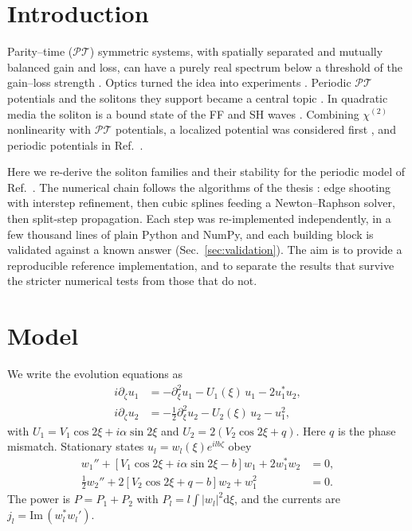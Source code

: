 \documentclass[pra,twocolumn,superscriptaddress,longbibliography]{revtex4-2}
\newcommand{\PT}{\mathcal{PT}}
\newcommand{\chit}{\chi^{(2)}}
\newcommand{\Img}{\mathrm{Im}\,}
\newcommand{\dd}{\mathrm{d}}
\begin{document}
\section{Introduction}
Parity--time ($\PT$) symmetric systems, with spatially separated and mutually balanced gain and
loss, can have a purely real spectrum below a threshold of the gain--loss strength
\cite{Bender1998,Bender2007}. Optics turned the idea into experiments \cite{Ruter2010}. Periodic
$\PT$ potentials and the solitons they support became a central topic
\cite{Makris2008,Musslimani2008,Nixon2012,Abdullaev2011,Zezyulin2012,Konotop2016,ElGanainy2018}.
In quadratic media the soliton is a bound state of the FF and SH waves
\cite{Etrich2000,Buryak2002}. Combining $\chit$ nonlinearity with $\PT$ potentials, a localized
potential was considered first \cite{Moreira2012}, and periodic potentials in
Ref.~\cite{MKM2013}.

Here we re-derive the soliton families and their stability for the periodic model of
Ref.~\cite{MKM2013}. The numerical chain follows the algorithms of the thesis
\cite{MoreiraThesis}: edge shooting with interstep refinement, then cubic splines feeding a
Newton--Raphson solver, then split-step propagation. Each step was re-implemented independently,
in a few thousand lines of plain Python and NumPy, and each building block is validated against a
known answer (Sec.~\ref{sec:validation}). The aim is to provide a reproducible reference
implementation, and to separate the results that survive the stricter numerical tests from those
that do not.

\section{Model}\label{sec:model}
We write the evolution equations as
\begin{align}
i\partial_\zeta u_1 &= -\partial_\xi^2 u_1 - U_1(\xi)\,u_1 - 2u_1^{*}u_2, \label{eq:u1}\\
i\partial_\zeta u_2 &= -\tfrac12\partial_\xi^2 u_2 - U_2(\xi)\,u_2 - u_1^{2}, \label{eq:u2}
\end{align}
with $U_1 = V_1\cos 2\xi + i\alpha\sin 2\xi$ and $U_2 = 2(V_2\cos 2\xi + q)$. Here $q$ is the
phase mismatch. Stationary states $u_l = w_l(\xi)e^{ilb\zeta}$ obey
\begin{align}
w_1'' + \left[V_1\cos 2\xi + i\alpha\sin 2\xi - b\right]w_1 + 2w_1^{*}w_2 &= 0, \label{eq:w1}\\
\tfrac12 w_2'' + 2\left[V_2\cos 2\xi + q - b\right]w_2 + w_1^{2} &= 0. \label{eq:w2}
\end{align}
The power is $P = P_1 + P_2$ with $P_l = l\int|w_l|^2\dd\xi$, and the currents are
$j_l = \Img(w_l^{*}w_l')$.
\end{document}
